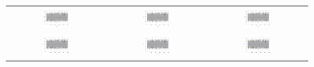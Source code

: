 \begin{figure}
\centering
\begin{tabular}{ccc}
%
  \includegraphics[page=1,width=0.3\textwidth]{figures/cal_trace.pdf} &
  \includegraphics[page=2,width=0.3\textwidth]{figures/cal_trace.pdf} &
  \includegraphics[page=3,width=0.3\textwidth]{figures/cal_trace.pdf} \\
  \includegraphics[page=4,width=0.3\textwidth]{figures/cal_trace.pdf} &
  \includegraphics[page=5,width=0.3\textwidth]{figures/cal_trace.pdf} &
  \includegraphics[page=6,width=0.3\textwidth]{figures/cal_trace.pdf} \\

\end{tabular}
\end{figure}
